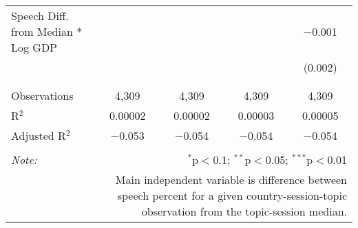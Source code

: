 \begin{table}[!htbp]
\begin{tabular}{@{\extracolsep{5pt}}lcccc}
 Speech Diff. from Median * Log GDP &  &  &  & $-$0.001 \\ 
  &  &  &  & (0.002) \\ 
  & & & & \\ 
\hline \\[-1.8ex] 
Observations & 4,309 & 4,309 & 4,309 & 4,309 \\ 
R$^{2}$ & 0.00002 & 0.00002 & 0.00003 & 0.00005 \\ 
Adjusted R$^{2}$ & $-$0.053 & $-$0.054 & $-$0.054 & $-$0.054 \\ 
\hline 
\hline \\[-1.8ex] 
\textit{Note:}  & \multicolumn{4}{r}{$^{*}$p$<$0.1; $^{**}$p$<$0.05; $^{***}$p$<$0.01} \\ 
 & \multicolumn{4}{r}{Main independent variable is difference between speech percent for a given country-session-topic observation from the topic-session median.} \\ 
\end{tabular} 
\end{table} 
